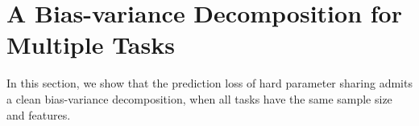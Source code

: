 \section{A Bias-variance Decomposition for Multiple Tasks}\label{sec_same}

In this section, we show that the prediction loss of hard parameter sharing admits a clean bias-variance decomposition, when all tasks have the same sample size and features.

